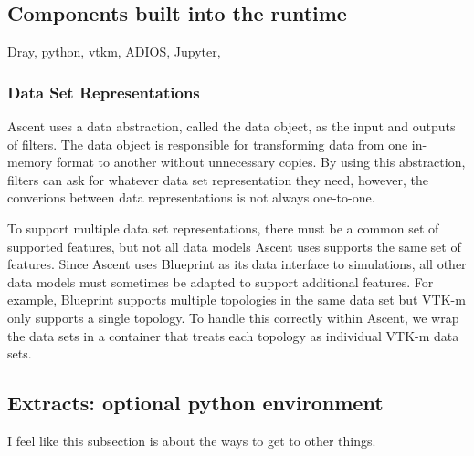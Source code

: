 \subsection{Components built into the runtime}
Dray, python, vtkm, ADIOS, Jupyter,

\subsubsection{Data Set Representations}
Ascent uses a data abstraction, called the data object, as the input
and outputs of filters.
%
The data object is responsible for transforming data from one in-memory format
to another without unnecessary copies.
%
By using this abstraction, filters can ask for whatever data set
representation they need, however, the converions between data
representations is not always one-to-one.
%

To support multiple data set representations, there must be a common
set of supported features, but not all data models Ascent uses
supports the same set of features.
%
Since Ascent uses Blueprint as its data interface to simulations,
all other data models must sometimes be adapted to support additional
features.
%
For example, Blueprint supports multiple topologies in the same data set
but VTK-m only supports a single topology.
%
To handle this correctly within Ascent, we wrap the data sets in a container
that treats each topology as individual VTK-m data sets.
%

\subsection{Extracts: optional python environment}
I feel like this subsection is about the ways to get to other things.
